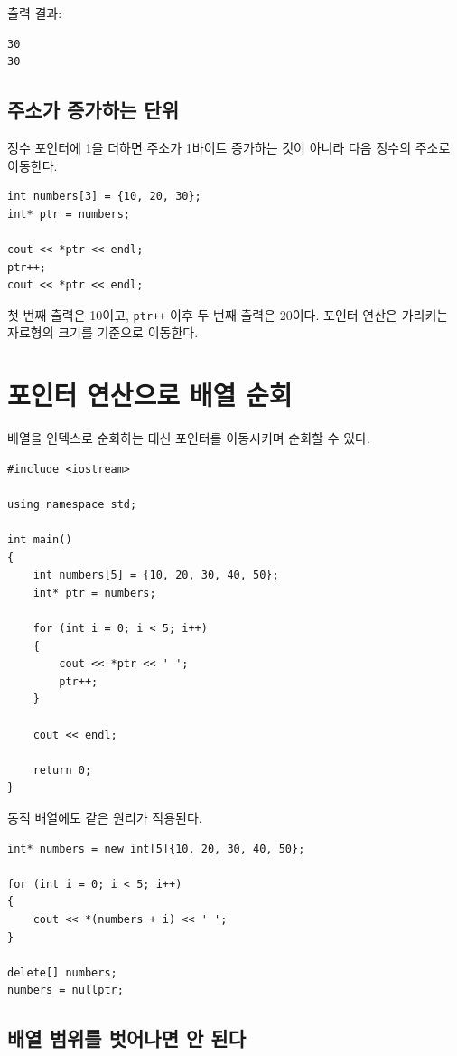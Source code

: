 \documentclass[11pt,a4paper]{article}
\begin{document}
출력 결과:

\begin{verbatim}
30
30
\end{verbatim}

\subsection{주소가 증가하는 단위}

정수 포인터에 1을 더하면 주소가 1바이트 증가하는 것이 아니라 다음 정수의 주소로 이동한다.

\begin{lstlisting}
int numbers[3] = {10, 20, 30};
int* ptr = numbers;

cout << *ptr << endl;
ptr++;
cout << *ptr << endl;
\end{lstlisting}

첫 번째 출력은 10이고, \texttt{ptr++} 이후 두 번째 출력은 20이다.
포인터 연산은 가리키는 자료형의 크기를 기준으로 이동한다.

\section{포인터 연산으로 배열 순회}

배열을 인덱스로 순회하는 대신 포인터를 이동시키며 순회할 수 있다.

\begin{lstlisting}
#include <iostream>

using namespace std;

int main()
{
    int numbers[5] = {10, 20, 30, 40, 50};
    int* ptr = numbers;

    for (int i = 0; i < 5; i++)
    {
        cout << *ptr << ' ';
        ptr++;
    }

    cout << endl;

    return 0;
}
\end{lstlisting}

동적 배열에도 같은 원리가 적용된다.

\begin{lstlisting}
int* numbers = new int[5]{10, 20, 30, 40, 50};

for (int i = 0; i < 5; i++)
{
    cout << *(numbers + i) << ' ';
}

delete[] numbers;
numbers = nullptr;
\end{lstlisting}

\subsection{배열 범위를 벗어나면 안 된다}
\end{document}
